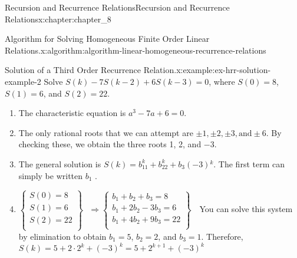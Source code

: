 \documentclass[twoside,10pt,]{book}
\numberwithin{equation}{section}
\begin{document}
\begin{chapterptx}{Recursion and Recurrence Relations}{}{Recursion and Recurrence Relations}{}{}{x:chapter:chapter_8}
\begin{algorithm}{Algorithm for Solving Homogeneous Finite Order Linear Relations.}{}{x:algorithm:algorithm-linear-homogeneous-recurrence-relations}
\begin{enumerate}[label=(\alph*)]
\end{enumerate}
%
\end{algorithm}
\begin{example}{Solution of a Third Order Recurrence Relation.}{x:example:ex-hrr-solution-example-2}%
Solve \(S(k) - 7S(k - 2) + 6S(k - 3) = 0\), where \(S(0) =8\), \(S(1) = 6\), and \(S(2) = 22\).%
\par
%
\begin{enumerate}[label=(\alph*)]
\item{}The characteristic equation is \(a^3 - 7a + 6 = 0\).%
\item{}The only rational roots that we can attempt are \(\pm  1, \pm 2, \pm 3, \textrm{and} \pm 6\). By checking these, we obtain the three roots 1, 2, and \(-3\).%
\item{}The general solution is \(S(k) =b_11^k+b_22^k+b_3(-3){}^k\). The first term can simply be written \(b_1\) .%
\item{}\(\left\{
\begin{array}{c}
S(0)=8 \\
S(1)=6 \\
S(2)=22 \\
\end{array}
\right\}\textrm{   }\Rightarrow \left\{
\begin{array}{c}
b_1+b_2+b_3=8 \\
b_1+2b_2-3b_3=6 \\
b_1+4b_2+9b_3=22 \\
\end{array}
\right\}\textrm{  }\) You can solve this system by elimination to obtain \(b_1=5\), \(b_2=2\), and \(b_3=1\). Therefore, \(\quad\)\(S(k) = 5 + 2\cdot 2^k + (-3)^k = 5 + 2^{k+1} + (-3)^k\)%
\end{enumerate}
%
\end{example}
\end{chapterptx}
%
%
\typeout{************************************************}
\typeout{************************************************}
%
\end{document}

